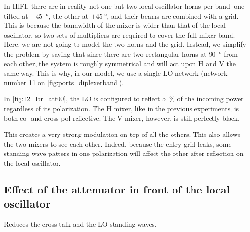 In HIFI, there are in reality not one but two local oscillator horns per band, one tilted at \SI{-45}{\degree}, the other at $+\SI{45}{\degree}$, and their beams are combined with a grid.
This is because the bandwidth of the mixer is wider than that of the local oscillator, so two sets of multipliers are required to cover the full mixer band.
Here, we are not going to model the two horns and the grid.
Instead, we simplify the problem by saying that since there are two rectangular horns at \SI{90}{\degree} from each other, the system is roughly symmetrical and will act upon H and V the same way.
This is why, in our model, we use a single LO network (network number 11 on \cref{fig:ports_diplexerband}).

In \cref{fig:12_lor_att00}, the LO is configured to reflect \SI{5}{\percent} of the incoming power regardless of its polarization.
The H mixer, like in the previous experiments, is both co- and cross-pol reflective.
The V mixer, however, is still perfectly black.

This creates a very strong modulation on top of all the others.
This also allows the two mixers to see each other.
Indeed, because the entry grid leaks, some standing wave patters in one polarization will affect the other after reflection on the local oscillator.


\clearpage
\subsection{Effect of the attenuator in front of the local oscillator}
Reduces the cross talk and the LO standing waves.

